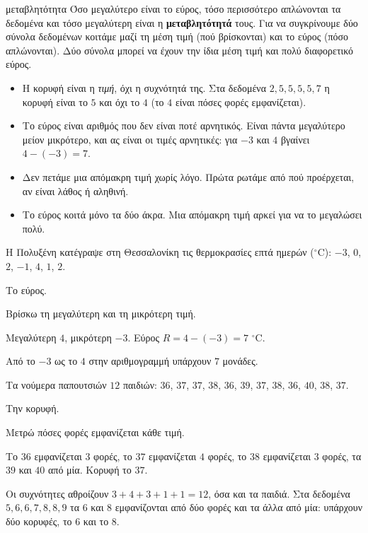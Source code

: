 \begin{idiotita}{μεταβλητότητα}
Όσο μεγαλύτερο είναι το εύρος, τόσο περισσότερο απλώνονται τα δεδομένα και τόσο μεγαλύτερη είναι η \textbf{μεταβλητότητά} τους. Για να συγκρίνουμε δύο σύνολα δεδομένων κοιτάμε μαζί τη μέση τιμή (πού βρίσκονται) και το εύρος (πόσο απλώνονται). Δύο σύνολα μπορεί να έχουν την ίδια μέση τιμή και πολύ διαφορετικό εύρος.
\end{idiotita}

\begin{prosoxi}
\begin{itemize}[leftmargin=1.2em,itemsep=0.3ex,topsep=2pt]
\item Η κορυφή είναι η \emph{τιμή}, όχι η συχνότητά της. Στα δεδομένα $2,5,5,5,5,7$ η κορυφή είναι το $5$ και όχι το $4$ (το $4$ είναι πόσες φορές εμφανίζεται).
\item Το εύρος είναι αριθμός που δεν είναι ποτέ αρνητικός. Είναι πάντα μεγαλύτερο μείον μικρότερο, και ας είναι οι τιμές αρνητικές: για $-3$ και $4$ βγαίνει $4-(-3)=7$.
\item Δεν πετάμε μια απόμακρη τιμή χωρίς λόγο. Πρώτα ρωτάμε από πού προέρχεται, αν είναι λάθος ή αληθινή.
\item Το εύρος κοιτά μόνο τα δύο άκρα. Μια απόμακρη τιμή αρκεί για να το μεγαλώσει πολύ.
\end{itemize}
\end{prosoxi}


\tixero Η Πολυξένη κατέγραψε στη Θεσσαλονίκη τις θερμοκρασίες επτά ημερών ($^\circ$C): $-3$, $0$, $2$, $-1$, $4$, $1$, $2$.\par
\tithelo Το εύρος.\par
\possindeo Βρίσκω τη μεγαλύτερη και τη μικρότερη τιμή.\par
\apantisi Μεγαλύτερη $4$, μικρότερη $-3$. Εύρος $R=4-(-3)=7$ $^\circ$C.\par
\elegxos Από το $-3$ ως το $4$ στην αριθμογραμμή υπάρχουν $7$ μονάδες.

\tixero Τα νούμερα παπουτσιών $12$ παιδιών: $36$, $37$, $37$, $38$, $36$, $39$, $37$, $38$, $36$, $40$, $38$, $37$.\par
\tithelo Την κορυφή.\par
\possindeo Μετρώ πόσες φορές εμφανίζεται κάθε τιμή.\par
\apantisi Το $36$ εμφανίζεται $3$ φορές, το $37$ εμφανίζεται $4$ φορές, το $38$ εμφανίζεται $3$ φορές, τα $39$ και $40$ από μία. Κορυφή το $37$.\par
\elegxos Οι συχνότητες αθροίζουν $3+4+3+1+1=12$, όσα και τα παιδιά. Στα δεδομένα $5,6,6,7,8,8,9$ τα $6$ και $8$ εμφανίζονται από δύο φορές και τα άλλα από μία: υπάρχουν δύο κορυφές, το $6$ και το $8$.

